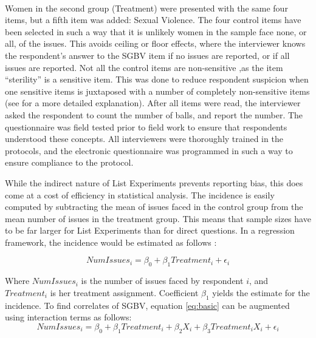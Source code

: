 \documentclass[11pt,a4paper]{scrartcl} %
\begin{document}
\paragraph{}
Women in the second group (Treatment) were presented with the same four items, but a fifth item was added: Sexual Violence.  The four control items have been selected in such a way that it is unlikely women in the sample face none, or all, of the issues. This avoids ceiling or floor effects, where the interviewer knows the respondent's answer to the SGBV item if no issues are reported, or if all issues are reported. Not all the control items are non-sensitive ,as the item ``sterility'' is a sensitive item. This was done to reduce respondent suspicion when one sensitive items is juxtaposed with a number of completely non-sensitive items (see \citep{Chuang2019} for a more detailed explanation). After all items were read, the interviewer asked the respondent to count the number of balls, and report the number. The questionnaire was field tested prior to field work to ensure that respondents understood these concepts. All interviewers were thoroughly trained in the protocols, and the electronic questionnaire was programmed in such a way to ensure compliance to the protocol.

While the indirect nature of List Experiments prevents reporting bias, this does come at a cost of efficiency in statistical analysis. The incidence is easily computed by subtracting the mean of issues faced in the control group from the mean number of issues in the treatment group. This means that sample sizes have to be far larger for List Experiments than for direct questions. In a regression framework, the incidence would be estimated as follows \cite{Holbrook2010}:

\begin{equation}
\label{eq:basic}
NumIssues_i = \beta_0 + \beta_1 Treatment_i + \epsilon_i
\end{equation}

Where \(NumIssues_i\) is the number of issues faced by respondent $i$, and \(Treatment_i\) is her treatment assignment. Coefficient \(\beta_1\) yields the estimate for the incidence. To find correlates of SGBV, equation \ref{eq:basic} can be augmented using interaction terms as follows: 
\begin{equation}
\label{eq:interaction}
NumIssues_i = \beta_0 + \beta_1 Treatment_i + \beta_2 X_i + \beta_3 Treatment_i X_i + \epsilon_i
\end{equation}
\end{document}
